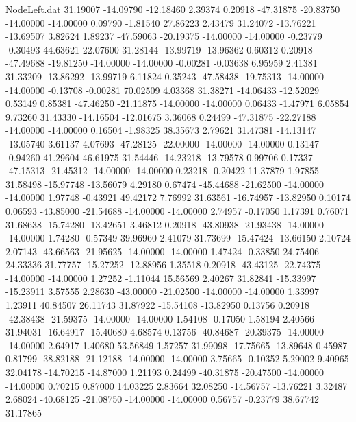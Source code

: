 \begin{filecontents}{NodeLeft.dat}
  31.19007  -14.09790  -12.18460     2.39374    0.20918  -47.31875  -20.83750  -14.00000  -14.00000    0.09790   -1.81540   27.86223    2.43479
  31.24072  -13.76221  -13.69507     3.82624    1.89237  -47.59063  -20.19375  -14.00000  -14.00000   -0.23779   -0.30493   44.63621   22.07600
  31.28144  -13.99719  -13.96362     0.60312    0.20918  -47.49688  -19.81250  -14.00000  -14.00000   -0.00281   -0.03638    6.95959    2.41381
  31.33209  -13.86292  -13.99719     6.11824    0.35243  -47.58438  -19.75313  -14.00000  -14.00000   -0.13708   -0.00281   70.02509    4.03368
  31.38271  -14.06433  -12.52029     0.53149    0.85381  -47.46250  -21.11875  -14.00000  -14.00000    0.06433   -1.47971    6.05854    9.73260
  31.43330  -14.16504  -12.01675     3.36068    0.24499  -47.31875  -22.27188  -14.00000  -14.00000    0.16504   -1.98325   38.35673    2.79621
  31.47381  -14.13147  -13.05740     3.61137    4.07693  -47.28125  -22.00000  -14.00000  -14.00000    0.13147   -0.94260   41.29604   46.61975
  31.54446  -14.23218  -13.79578     0.99706    0.17337  -47.15313  -21.45312  -14.00000  -14.00000    0.23218   -0.20422   11.37879    1.97855
  31.58498  -15.97748  -13.56079     4.29180    0.67474  -45.44688  -21.62500  -14.00000  -14.00000    1.97748   -0.43921   49.42172    7.76992
  31.63561  -16.74957  -13.82950     0.10174    0.06593  -43.85000  -21.54688  -14.00000  -14.00000    2.74957   -0.17050    1.17391    0.76071
  31.68638  -15.74280  -13.42651     3.46812    0.20918  -43.80938  -21.93438  -14.00000  -14.00000    1.74280   -0.57349   39.96960    2.41079
  31.73699  -15.47424  -13.66150     2.10724    2.07143  -43.66563  -21.95625  -14.00000  -14.00000    1.47424   -0.33850   24.75406   24.33336
  31.77757  -15.27252  -12.88956     1.35518    0.20918  -43.43125  -22.74375  -14.00000  -14.00000    1.27252   -1.11044   15.56569    2.40267
  31.82841  -15.33997  -15.23911     3.57555    2.28630  -43.00000  -21.02500  -14.00000  -14.00000    1.33997    1.23911   40.84507   26.11743
  31.87922  -15.54108  -13.82950     0.13756    0.20918  -42.38438  -21.59375  -14.00000  -14.00000    1.54108   -0.17050    1.58194    2.40566
  31.94031  -16.64917  -15.40680     4.68574    0.13756  -40.84687  -20.39375  -14.00000  -14.00000    2.64917    1.40680   53.56849    1.57257
  31.99098  -17.75665  -13.89648     0.45987    0.81799  -38.82188  -21.12188  -14.00000  -14.00000    3.75665   -0.10352    5.29002    9.40965
  32.04178  -14.70215  -14.87000     1.21193    0.24499  -40.31875  -20.47500  -14.00000  -14.00000    0.70215    0.87000   14.03225    2.83664
  32.08250  -14.56757  -13.76221     3.32487    2.68024  -40.68125  -21.08750  -14.00000  -14.00000    0.56757   -0.23779   38.67742   31.17865

\end{filecontents}
